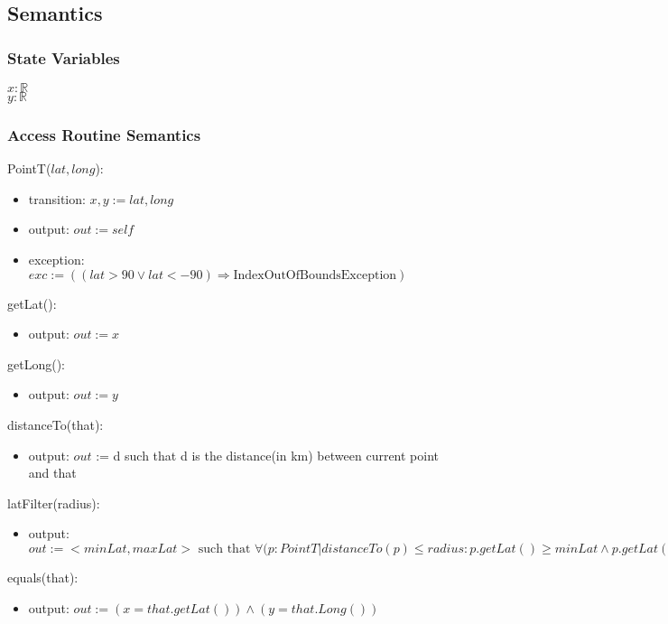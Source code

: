 \documentclass[12pt]{article}
\begin{document}
\subsection* {Semantics}

\subsubsection* {State Variables}

$\mathit{x}: \mathbb{R}$\\
$\mathit{y}: \mathbb{R}$


\subsubsection* {Access Routine Semantics}

PointT($lat, long$):
\begin{itemize}
\item transition: $x,y := lat, long$ 
\item output: $\mathit{out} := \mathit{self}$
\item exception: $exc := ((lat > 90 \lor lat < -90) \Rightarrow \mbox{IndexOutOfBoundsException})$
\end{itemize}


\noindent getLat():
\begin{itemize}
\item output: $\mathit{out} := x$ 
\end{itemize}

\noindent getLong():
\begin{itemize}
\item output: $\mathit{out} := y$
\end{itemize}

\noindent distanceTo(that):
\begin{itemize}
\item output: $\mathit{out}$ := d such that d is the distance(in km) between current point and that
\end{itemize}

\noindent latFilter(radius):
\begin{itemize}
\item output: $\mathit{out} := <minLat, maxLat> \mbox{ such that } \forall (p: PointT| 
  distanceTo(p) \le radius : p.getLat() \ge minLat \land p.getLat() \le maxLat$
\end{itemize}

\noindent equals(that):
\begin{itemize}
\item output: $\mathit{out} := (x = that.getLat()) \land (y = that.Long())$
\end{itemize}
\end{document}
